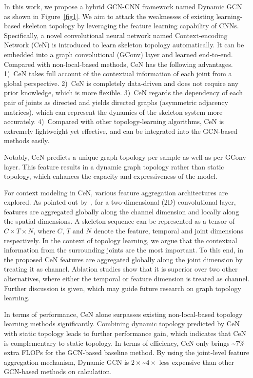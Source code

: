 \documentclass[sigconf]{acmart}
\begin{document}
In this work, we propose a hybrid GCN-CNN framework named Dynamic GCN as shown in Figure~\ref{fig1}. We aim to attack the weaknesses of existing learning-based skeleton topology by leveraging the feature learning capability of CNNs. Specifically, a novel convolutional neural network named Context-encoding Network (CeN) is introduced to learn skeleton topology automatically. It can be embedded into a graph convolutional (GConv) layer and learned end-to-end. Compared with non-local-based methods, CeN has the following advantages. 1)~CeN takes full account of the contextual information of each joint from a global perspective. 2)~CeN is completely data-driven and does not require any prior knowledge, which is more flexible. 3)~CeN regards the dependency of each pair of joints as directed and yields directed graphs (asymmetric adjacency matrices), which can represent the dynamics of the skeleton system more accurately. 4)~Compared with other topology-learning algorithms, CeN is extremely lightweight yet effective, and can be integrated into the GCN-based methods easily.

Notably, CeN predicts a unique graph topology per-sample as well as per-GConv layer. This feature results in a dynamic graph topology rather than static topology, which enhances the capacity and expressiveness of the model.






For context modeling in CeN, various feature aggregation architectures are explored. As pointed out by~\cite{lili}, for a two-dimensional (2D) convolutional layer, features are aggregated globally along the channel dimension and locally along the spatial dimensions. A skeleton sequence can be represented as a tensor of $C\times T \times N$, where $C$, $T$ and $N$ denote the feature, temporal and joint dimensions respectively. In the context of topology learning, we argue that the contextual information from the surrounding joints are the most important. To this end, in the proposed CeN features are aggregated globally along the joint dimension by treating it as channel. Ablation studies show that it is superior over two other alternatives, where either the temporal or feature dimension is treated as channel. Further discussion is given, which may guide future research on graph topology learning.

In terms of performance, CeN alone surpasses existing non-local-based topology learning methods significantly. Combining dynamic topology predicted by CeN with static topology leads to further performance gain, which indicates that CeN is complementary to static topology. In terms of efficiency, CeN only brings \textasciitilde7\% extra FLOPs for the GCN-based baseline method. By using the joint-level feature aggregation mechanism, Dynamic GCN is $2\times$\textasciitilde$4\times$ less expensive than other GCN-based methods on calculation.
\end{document}
